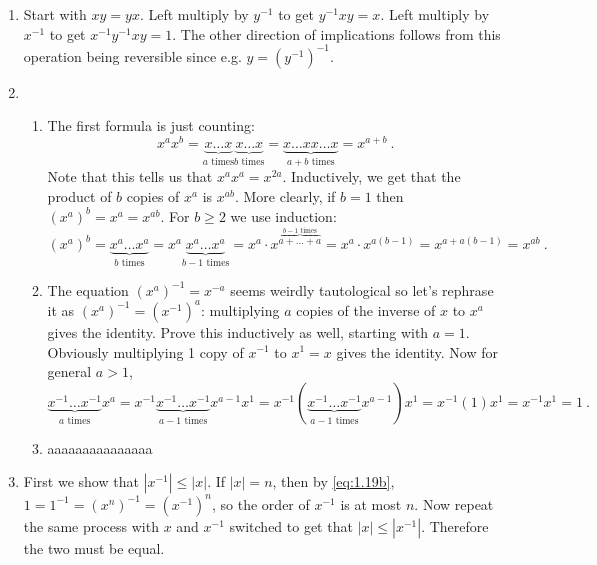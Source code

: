\documentclass[]{article}
\newcommand{\abs}[1]{\left\vert #1 \right\vert}
\begin{document}
\begin{enumerate}
\item Start with $xy = yx$. Left multiply by $y^{-1}$ to get $y^{-1}xy = x$. Left multiply by $x^{-1}$ to get $x^{-1}y^{-1}xy = 1$. The other direction of implications follows from this operation being reversible since e.g. $y = \left( y^{-1} \right)^{-1}$.


\item \begin{enumerate}
\item The first formula is just counting: \begin{equation}
x^a x^b = \underbrace{x\ldots x}_{a \text{\ times}} \underbrace{x\ldots x}_{b \text{\ times}} = \underbrace{x\ldots x x \ldots x}_{a+b \text{\ times}} = x^{a+b}\ .\label{eq:1.19a1}
\end{equation} Note that this tells us that $x^ax^a = x^{2a}$. Inductively, we get that the product of $b$ copies of $x^a$ is $x^{ab}$. More clearly,
if $b=1$ then $(x^a)^b = x^a = x^{ab}$. For $b\geq 2$ we use induction: 
\begin{equation}
(x^a)^b = \underbrace{x^a \ldots x^a}_{b\text{\ times}} = x^a \underbrace{x^a \ldots x^a}_{b-1\text{\ times}} = x^a \cdot x^{\overbrace{a + \ldots + a}^{b-1 \text{\ times}}} = x^a\cdot x^{a(b-1)} = x^{a+a(b-1)} = x^{ab}\ . \label{eq:1.19a2}
\end{equation}
\item The equation $(x^a)^{-1} = x^{-a}$ seems weirdly tautological so let's rephrase it as $(x^a)^{-1} = (x^{-1})^a$: multiplying $a$ copies of the inverse of $x$ to $x^a$ gives the identity. Prove this inductively as well, starting with $a=1$. Obviously multiplying 1 copy of $x^{-1}$ to $x^1 = x$ gives the identity. Now for general $a>1$,
\begin{equation}
\underbrace{x^{-1}\ldots x^{-1}}_{a\text{\ times}} x^{a} = x^{-1}\underbrace{x^{-1}\ldots x^{-1}}_{a-1\text{\ times}} x^{a-1}x^1 = x^{-1}\left(\underbrace{x^{-1}\ldots x^{-1}}_{a-1\text{\ times}} x^{a-1}\right)x^1 = x^{-1}(1)x^1 = x^{-1}x^1 = 1\ . \label{eq:1.19b}
\end{equation}
\item {\color{red} aaaaaaaaaaaaaaa}
\end{enumerate}


\item First we show that $\abs{x^{-1}} \leq \abs{x}$. If $\abs{x} = n$, then by \eqref{eq:1.19b}, $1 = 1^{-1} = (x^n)^{-1} = (x^{-1})^n$, so the order of $x^{-1}$ is at most $n$. Now repeat the same process with $x$ and $x^{-1}$ switched to get that $\abs{x} \leq \abs{x^{-1}}$. Therefore the two must be equal.



\end{enumerate}
\end{document}
